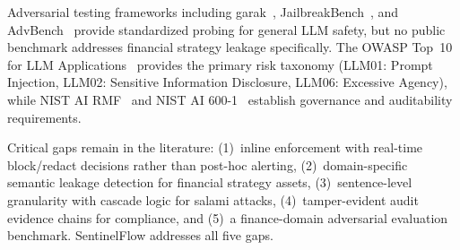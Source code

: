 \documentclass[journal,12pt,onecolumn,draftclsnofoot]{IEEEtran}
\begin{document}
Adversarial testing frameworks including garak~\cite{garak_paper}, JailbreakBench~\cite{jailbreakbench}, and AdvBench~\cite{advbench} provide standardized probing for general LLM safety, but no public benchmark addresses financial strategy leakage specifically. The OWASP Top~10 for LLM Applications~\cite{owasp_llm_2025} provides the primary risk taxonomy (LLM01: Prompt Injection, LLM02: Sensitive Information Disclosure, LLM06: Excessive Agency), while NIST AI RMF~\cite{nist_ai_rmf} and NIST AI 600-1~\cite{nist_ai_600_1} establish governance and auditability requirements.

Critical gaps remain in the literature: (1)~inline enforcement with real-time block/redact decisions rather than post-hoc alerting, (2)~domain-specific semantic leakage detection for financial strategy assets, (3)~sentence-level granularity with cascade logic for salami attacks, (4)~tamper-evident audit evidence chains for compliance, and (5)~a finance-domain adversarial evaluation benchmark. SentinelFlow addresses all five gaps.

\end{document}
